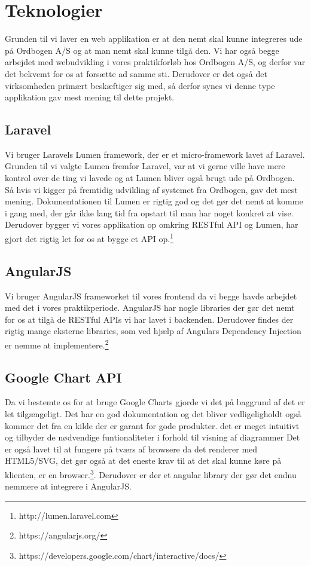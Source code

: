 \hypertarget{Teknologier}{}
\section{Teknologier}
Grunden til vi laver en web applikation er at den nemt skal kunne integreres ude på Ordbogen A/S  og at man nemt skal kunne tilgå den.
Vi har også begge arbejdet med webudvikling i vores praktikforløb hos Ordbogen A/S, og derfor var det bekvemt for os at forsætte ad samme sti.
Derudover er det også det virksomheden primært beskæftiger sig med, så derfor synes vi denne type applikation gav mest mening til dette projekt.
\hypertarget{Laravel}{}
\subsection{Laravel}
\label{Laravel}
Vi bruger Laravels Lumen framework, der er et micro-framework lavet af Laravel. Grunden til vi valgte Lumen
fremfor Laravel, var at vi gerne ville have mere kontrol over de ting vi lavede og at Lumen bliver også brugt ude på Ordbogen.
Så hvis vi kigger på fremtidig udvikling af systemet fra Ordbogen, gav det mest mening.
Dokumentationen til Lumen er rigtig god og det gør det nemt at komme i gang med, der går ikke lang tid fra opstart
til man har noget konkret at vise. 
Derudover bygger vi vores applikation op omkring RESTful API og Lumen, har gjort det rigtig let for os at bygge 
et API op.\footnote{http://lumen.laravel.com}
\hypertarget{AngularJS}{}
\subsection{AngularJS}
Vi bruger AngularJS frameworket til vores frontend da vi begge havde arbejdet med det
i vores praktikperiode. AngularJS har nogle libraries der gør det nemt for os at tilgå de RESTful APIs
vi har lavet i backenden. 
Derudover findes der rigtig mange eksterne libraries, som ved hjælp af Angulars Dependency Injection er nemme at implementere.\footnote{https://angularjs.org/}
\hypertarget{GoogleChartAPI}{}
\subsection{Google Chart API}
Da vi bestemte os for at bruge Google Charts gjorde vi det på baggrund af det er let tilgængeligt.
Det har en god dokumentation og det bliver vedligeligholdt også kommer det fra en kilde der er garant for gode produkter.
det er meget intuitivt og tilbyder de nødvendige funtionaliteter i forhold til visning af diagrammer 
Det er også lavet til at fungere på tværs af browsere da det renderer med HTML5/SVG, 
det gør også at det eneste krav til at det skal kunne køre på klienten, er en browser.\footnote{https://developers.google.com/chart/interactive/docs/}. 
Derudover er der et angular library der gør det endnu nemmere at integrere i AngularJS.
